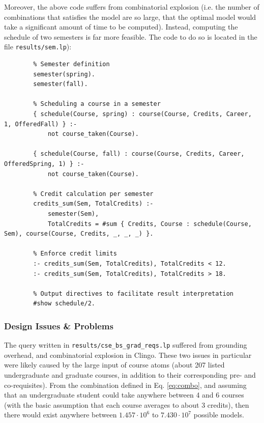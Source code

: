 \documentclass[12pt]{article}
\begin{document}
    Moreover, the above code suffers from combinatorial explosion (i.e. the number of combinations that satisfies the model are so large, that the optimal model would take a significant amount of time to be computed).
    Instead, computing the schedule of two semesters is far more feasible. The code to do so is located in the file {\tt{results/sem.lp}}): \\

    \begin{lstlisting}
        % Semester definition
        semester(spring).
        semester(fall).
        
        % Scheduling a course in a semester
        { schedule(Course, spring) : course(Course, Credits, Career, 1, OfferedFall) } :-
            not course_taken(Course).
        
        { schedule(Course, fall) : course(Course, Credits, Career, OfferedSpring, 1) } :-
            not course_taken(Course).
        
        % Credit calculation per semester
        credits_sum(Sem, TotalCredits) :-
            semester(Sem),
            TotalCredits = #sum { Credits, Course : schedule(Course, Sem), course(Course, Credits, _, _, _) }.
        
        % Enforce credit limits
        :- credits_sum(Sem, TotalCredits), TotalCredits < 12.
        :- credits_sum(Sem, TotalCredits), TotalCredits > 18.
        
        % Output directives to facilitate result interpretation
        #show schedule/2.
    \end{lstlisting}


    \subsubsection{Design Issues \& Problems}
    \label{subsubsec:des-iss-probs}

    The query written in {\tt{results/cse\_bs\_grad\_reqs.lp}} suffered from grounding overhead, and combinatorial explosion in Clingo. These two issues in particular were likely caused by the large input of course atoms (about 207 listed undergraduate and graduate courses, in addition to their corresponding pre- and co-requisites). From the combination defined in Eq. \ref{eq:combo}, and assuming that an undergraduate student could take anywhere between 4 and 6 courses (with the basic assumption that each course averages to about 3 credits), then there would exist anywhere between $1.457 \cdot 10^6$ to $7.430 \cdot 10^7$ possible models.
\end{document}
